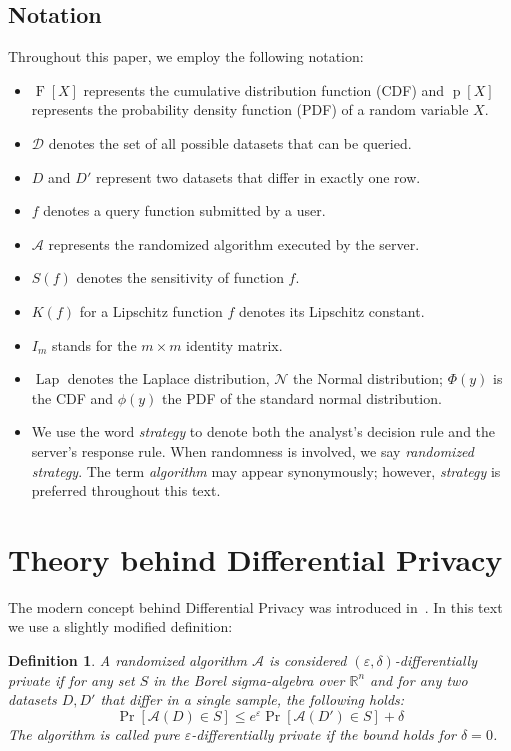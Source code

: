 \documentclass[12pt,letterpaper]{article}
\newcommand{\R}{\mathbb{R}}
\let\eps\varepsilon
\newcommand{\F}{\operatorname{F}}
\newcommand{\p}{\operatorname{p}}
\newtheorem{definition}{Definition}
\newcommand{\Lap}{\operatorname{Lap}}
\newcommand{\No}{\mathcal{N}}
\begin{document}
\subsection{Notation}
Throughout this paper, we employ the following notation:
\begin{itemize}
  \item $\F[X]$ represents the cumulative distribution function (CDF) and $\p[X]$ represents the probability density function (PDF) of a random variable $X$.
  \item $\mathcal{D}$ denotes the set of all possible datasets that can be queried.
  \item $D$ and $D'$ represent two datasets that differ in exactly one row.
  \item $f$ denotes a query function submitted by a user.
  \item $\mathcal{A}$ represents the randomized algorithm executed by the server.
  \item $S(f)$ denotes the sensitivity of function $f$.
  \item $K(f)$ for a Lipschitz function $f$ denotes its Lipschitz constant.
  \item $I_m$ stands for the $m \times m$ identity matrix.
  \item $\Lap$ denotes the Laplace distribution, $\No$ the Normal distribution; $\Phi(y)$ is the CDF and $\phi(y)$ the PDF of the standard normal distribution.
  \item We use the word \emph{strategy} to denote both the analyst's decision rule and the server's response rule. When randomness is involved, we say \emph{randomized strategy}. The term \emph{algorithm} may appear synonymously; however, \emph{strategy} is preferred throughout this text.
\end{itemize}

\section{Theory behind Differential Privacy}

The modern concept behind Differential Privacy was introduced in~\cite{dwork}. In this text we use a slightly modified definition:

\begin{definition}
A randomized algorithm $\mathcal{A}$ is considered $(\eps, \delta)$-differentially private if for any set $S$ in the Borel sigma-algebra over $\R^n$ and for any two datasets $D, D'$ that differ in a single sample, the following holds:
$$
\Pr[\mathcal{A}(D) \in S] \leq e^{\eps}\Pr[\mathcal{A}(D') \in S] + \delta
$$
The algorithm is called pure $\eps$-differentially private if the bound holds for $\delta=0$.
\end{definition}
\end{document}
